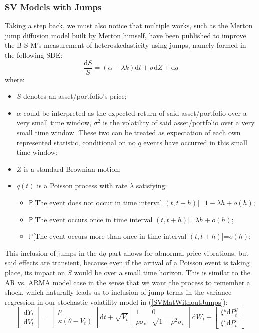 \documentclass[letterpaper]{article}
\newcommand{\df}{\mathrm{d}}
\newcommand{\prob}{\mathbb{P}}
\begin{document}
	\subsubsection{SV Models with Jumps}
	Taking a step back, we must also notice that multiple works, such as the Merton jump diffusion model built by Merton himself\cite{merton1976jumps}, have been published to improve the B-S-M's measurement of heteroskedasticity using jumps, namely formed in the following SDE:
	\begin{equation}
	\frac{\df S}{S} = (\alpha-\lambda k)\df t+\sigma \df Z+\df q
	\end{equation}
	where:
	\begin{itemize}
		\item $S$ denotes an asset/portfolio's price;
		\item $\alpha$ could be interpreted as the expected return of said asset/portfolio over a very small time window, $\sigma^2$ is the volatility of said asset/portfolio over a very small time window. These two can be treated as expectation of each own represented statistic, conditional on no $q$ events have occurred in this small time window;
		\item $Z$ is a standard Brownian motion;
		\item $q(t)$ is a Poisson process with rate $\lambda$ satisfying:
		\begin{itemize}
			\item $\prob$[The event does not occur in time interval $(t,t+h)$]=$1-\lambda h+o(h)$;
			\item $\prob$[The event occurs once in time interval $(t,t+h)$]=$\lambda h+o(h)$;
			\item $\prob$[The event occurs more than once in time interval $(t,t+h)$]=$o(h)$;
		\end{itemize}
	\end{itemize}
	This inclusion of jumps in the $\df q$ part allows for abnormal price vibrations, but said effects are transient, because even if the arrival of a Poisson event is taking place, its impact on $S$ would be over a small time horizon. This is similar to the AR vs. ARMA model case in the sense that we want the process to remember a shock, which naturally leads us to inclusion of jump terms in the variance regression in our stochastic volatility model in (\ref{SVMatWithoutJumps}):
	\begin{equation}\label{SVMatWithJumps}
	\begin{bmatrix}
	\df Y_t\\
	\df V_t
	\end{bmatrix} = 
	\begin{bmatrix}
	\mu\\
	\kappa(\theta-V_t)
	\end{bmatrix}\df t+
	\sqrt{V_t}\begin{bmatrix}
	1 & 0 \\
	\rho\sigma_v &\sqrt{1-\rho^2}\sigma_v
	\end{bmatrix}\df W_t
	+\begin{bmatrix}
	\xi^y\df P_t^{y}\\
	\xi^v\df P_t^{v}
	\end{bmatrix}
	\end{equation}
\end{document}
